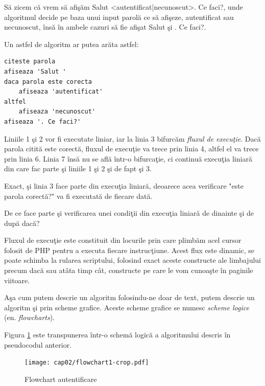 Să zicem că vrem să afişăm {\glqq}Salut <autentificat|necunoscut>. Ce faci?{\grqq},
unde algoritmul decide pe baza unui input {\glqq}parolă{\grqq} ce să afişeze, {\glqq}autentificat{\grqq}
sau {\glqq}necunoscut{\grqq}, însă în ambele cazuri să fie afişat {\glqq}Salut {\grqq} şi {\glqq}. Ce faci?{\grqq}.

Un astfel de algoritm ar putea arăta astfel:
\begin{lstlisting}[language=pseudocod]
citeste parola
afiseaza 'Salut '
daca parola este corecta
	afiseaza 'autentificat'
altfel
	afiseaza 'necunoscut'
afiseaza '. Ce faci?'
\end{lstlisting}

Liniile 1 şi 2 vor fi executate liniar, iar la linia 3 bifurcăm \textsl{fluxul de execuţie}.
Dacă parola citită este corectă, fluxul de execuţie va trece prin linia 4, altfel
el va trece prin linia 6. Linia 7 însă nu se află într-o bifurcaţie, ci continuă
execuţia liniară din care fac parte şi liniile 1 şi 2 şi de fapt şi 3.

Exact, şi linia 3 face parte din execuţia liniară, deoarece acea verificare "este
parola corectă?" va fi executată de fiecare dată.

\begin{Exercise}[title={Execuţia liniară conţine şi verificarea condiţiei},difficulty=1]
De ce face parte şi verificarea unei condiţii din execuţia liniară de dinainte şi de după
{\glqq}dacă{\grqq}?
\end{Exercise}


Fluxul de execuţie este constituit din {\glqq}locurile{\grqq} prin care plimbăm
acel {\glqq}cursor{\grqq} folosit de PHP pentru a executa fiecare instrucţiune.
Acest flux este dinamic, se poate schimba la rularea scriptului,
folosind exact aceste constructe ale limbajului precum {\glqq}dacă{\grqq} sau {\glqq}atâta timp cât{\grqq},
constructe pe care le vom cunoaşte în paginile viitoare.

Aşa cum putem descrie un algoritm folosindu-ne doar de text, putem
descrie un algoritm şi prin scheme grafice. Aceste scheme grafice se numesc
\textit{scheme logice} (en. \textsl{flowcharts}).

Figura \ref{fig:flowchart authenticated} este transpunerea
într-o schemă logică a algoritmului descris în pseudocodul anterior.

\begin{figure}[ht!]
  \centering
    \texttt{[image: cap02/flowchart1-crop.pdf]}
  \caption{Flowchart autentificare}
  \label{fig:flowchart authenticated}
\end{figure}

